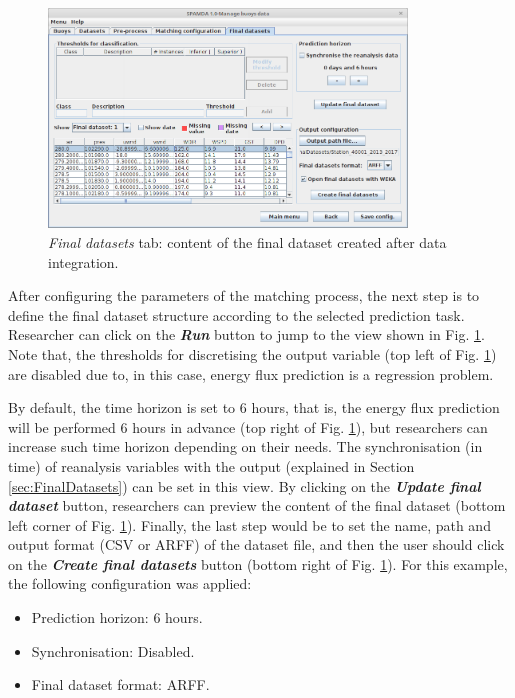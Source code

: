\documentclass[energies,article,submit,moreauthors,pdftex]{Definitions/mdpi}
\begin{document}
			\begin{figure}[ht!]
				\centering
				\includegraphics[width=0.85\textwidth]{figures/FigureFinal_datasets_EF.png}
				\caption{\textit{Final datasets} tab: content of the final dataset created after data integration.}\label{fig:final_dataset_EF}
			\end{figure}
			
			After configuring the parameters of the matching process, the next step is to define the final dataset structure according to the selected prediction task. Researcher can click on the \textbf{\textit{Run}} button to jump to the view shown in Fig. \ref{fig:final_dataset_EF}. Note that, the thresholds for discretising the output variable (top left of Fig. \ref{fig:final_dataset_EF}) are disabled due to, in this case, energy flux prediction is a regression problem.

			By default, the time horizon is set to $6$ hours, that is, the energy flux prediction will be performed $6$ hours in advance (top right of Fig. \ref{fig:final_dataset_EF}), but researchers can increase such time horizon depending on their needs. The synchronisation (in time) of reanalysis variables with the output (explained in Section {\ref{sec:FinalDatasets}}) can be set in this view. By clicking on the \textbf{\textit{Update final dataset}} button, researchers can preview the content of the final dataset (bottom left corner of Fig. \ref{fig:final_dataset_EF}). Finally, the last step would be to set the name, path and output format (CSV or ARFF) of the dataset file, and then the user should click on the \textbf{\textit{Create final datasets}} button (bottom right of Fig. \ref{fig:final_dataset_EF}). For this example, the following configuration was applied:

			\begin{itemize}
				\item Prediction horizon: 6 hours.
				\item Synchronisation: Disabled.
				\item Final dataset format: ARFF.
			\end{itemize}
			
\end{document}

